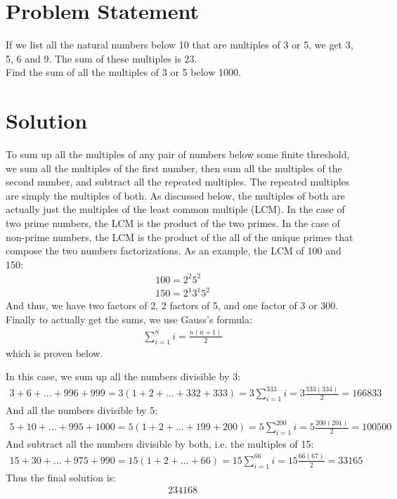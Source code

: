 \documentclass{article}
\begin{document}
\section{Problem Statement}
If we list all the natural numbers below 10 that are multiples of 3 or 5, we get 3, 5, 6 and 9. The sum of these multiples is 23.\\[12pt]

\noindent Find the sum of all the multiples of 3 or 5 below 1000.
\section{Solution}
To sum up all the multiples of any pair of numbers below some finite threshold, we sum all the multiples of the first number, then sum all the multiples of the second number, and subtract all the repeated multiples. The repeated multiples are simply the multiples of both. As discussed below, the multiples of both are actually just the multiples of the least common multiple (LCM). In the case of two prime numbers, the LCM is the product of the two primes. In the case of non-prime numbers, the LCM is the product of the all of the unique primes that compose the two numbers factorizations. As an example, the LCM of 100 and 150:
\begin{align*}
	100 = 2^{2}5^{2}\\
	150 = 2^{1}3^{1}5^{2}
\end{align*}
And thus, we have two factors of 2, 2 factors of 5, and one factor of 3 or 300. Finally to actually get the sums, we use Gauss's formula:
\begin{gather*}
	\sum_{i = 1}^{n}i = \frac{n(n + 1)}{2}
\end{gather*}
which is proven below.

In this case, we sum up all the numbers divisible by 3:
\begin{gather*}
	3 + 6 + ... + 996 + 999 = 3(1 + 2 + ... + 332 + 333) = 3\sum_{i = 1}^{333}i = 3\frac{333(334)}{2} = 166833
\end{gather*}
And all the numbers divisible by 5:
\begin{gather*}
	5 + 10 + ... + 995 + 1000 = 5(1 + 2 + ... + 199 + 200) = 5\sum_{i = 1}^{200}i = 5\frac{200(201)}{2} = 100500
\end{gather*}
And subtract all the numbers divisible by both, i.e. the multiples of 15:
\begin{gather*}
	15 + 30 + ... + 975 + 990 = 15(1 + 2 + ... + 66) = 15\sum_{i = 1}^{66}i =  15\frac{66(67)}{2} = 33165
\end{gather*}
Thus the final solution is:
\begin{gather*}
	234168
\end{gather*}
\end{document}

